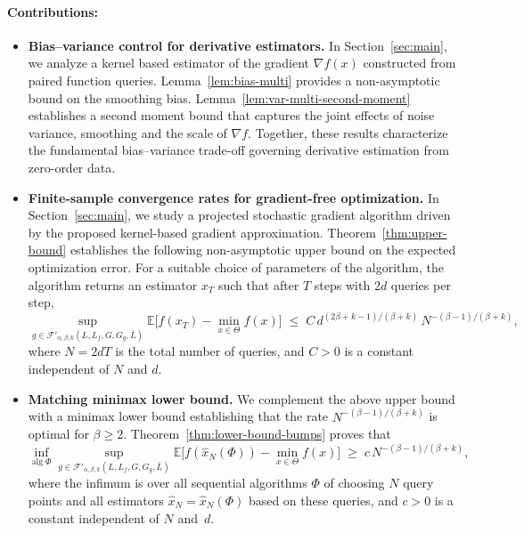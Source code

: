 \documentclass{article}
\renewcommand{\geq}{\geqslant}
\renewcommand{\le}{\leqslant}
\renewcommand{\ge}{\geqslant}
\renewcommand{\hat}{\widehat}
\theoremstyle{definition}
\begin{document}
\paragraph{Contributions:}
\begin{itemize}
    \item \textbf{Bias--variance control for derivative estimators.} In Section~\ref{sec:main}, we analyze a kernel based estimator of the gradient $\nabla f(x)$ %
    constructed from %
    paired function
    queries. Lemma~\ref{lem:bias-multi} provides a non-asymptotic bound on the smoothing bias.
    Lemma~\ref{lem:var-multi-second-moment}
    establishes a second moment bound that captures the joint effects of noise variance, smoothing
    and the scale of $\nabla f$. Together, these results characterize the fundamental bias--variance trade-off governing derivative estimation from zero-order data.

   \item \textbf{Finite-sample convergence rates for gradient-free 
optimization.} In Section~\ref{sec:main}, we study a projected stochastic 
gradient algorithm driven by the proposed kernel-based gradient 
approximation. Theorem~\ref{thm:upper-bound} establishes the following 
non-asymptotic upper bound on the expected optimization error. For a 
suitable choice of parameters of the algorithm, the algorithm returns an estimator $x_T$ such that after $T$ steps with $2d$ queries per step,
\[
\sup_{g \in \mathcal{F}'_{\alpha,\beta,k}(L,L_f,G,G_g,\bar{L})}
\mathbb{E}\bigl[f(x_T)-\min_{x\in \Theta}f(x)\bigr]
\;\le\; C\,d^{(2\beta+k-1)/(\beta+k)}\,N^{-(\beta-1)/(\beta+k)},
\]
where $N = 2dT$ is the total number of queries, and $C > 0$ is a 
constant independent of $N$ and $d$.


   \item \textbf{Matching minimax lower bound.}
We complement the above upper bound with a minimax lower bound 
establishing that the rate $N^{-(\beta-1)/(\beta+k)}$ is optimal for 
$\beta \geq 2$. Theorem~\ref{thm:lower-bound-bumps} proves that
\[
\inf_{\mathrm{alg}\;\Phi}\sup_{g \in \mathcal{F}'_{\alpha,\beta,k}(L,L_f,G,G_g,\bar{L})}
\mathbb{E}\bigl[f(\hat{x}_N(\Phi))-\min_{x\in \Theta}f(x)\bigr]
\;\ge\; c\,N^{-(\beta-1)/(\beta+k)},
\]
where the infimum is over all sequential algorithms $\Phi$ of choosing $N$ query points and all estimators $\hat{x}_N=\hat{x}_N(\Phi)$ based on these queries, and $c > 0$ is a constant independent of  
$N$ and~$d$. %
\end{itemize}
\end{document}
